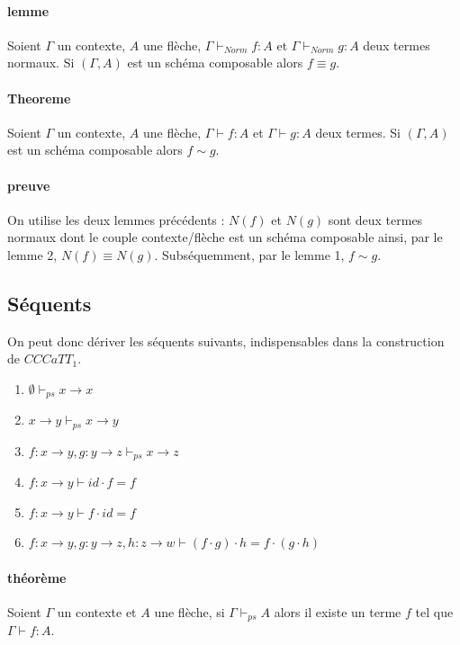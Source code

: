 \documentclass[12pt']{article}
\begin{document}
\paragraph{lemme} Soient $\Gamma$ un contexte, $A$ une flèche, $\Gamma \vdash_{Norm} f : A$ et $\Gamma \vdash_{Norm} g : A$ deux termes normaux. Si $(\Gamma, A)$ est un schéma composable alors $f \equiv g$.

\paragraph{Theoreme} Soient $\Gamma$ un contexte, $A$ une flèche, $\Gamma \vdash f : A$ et $\Gamma \vdash g : A$ deux termes. Si $(\Gamma, A)$ est un schéma composable alors $f \sim g$.

\paragraph{preuve} On utilise les deux lemmes précédents : $N(f)$ et $N(g)$ sont deux termes normaux dont le couple contexte/flèche est un schéma composable ainsi, par le lemme 2, $N(f) \equiv N(g)$. Subséquemment, par le lemme 1, $f \sim g$.

\subsection{Séquents}
On peut donc dériver les séquents suivants, indispensables dans la construction de $CCCaTT_1$.

\begin{enumerate}
	\item $\emptyset \vdash_{ps} x \rightarrow x$
	\item $x \rightarrow y \vdash_{ps} x \rightarrow y$
	\item $f : x \rightarrow y, g : y \rightarrow z \vdash_{ps} x \rightarrow z$
	\item $f : x \rightarrow y \vdash id \cdot f = f$
	\item $f : x \rightarrow y \vdash f \cdot id = f$
	\item $f : x \rightarrow y, g : y \rightarrow z, h : z \rightarrow w \vdash (f \cdot g) \cdot h = f \cdot (g \cdot h)$
\end{enumerate}

\paragraph{théorème}Soient $\Gamma$ un contexte et $A$ une flèche, si $\Gamma \vdash_{ps} A$ alors il existe un terme $f$ tel que $\Gamma \vdash f : A$.
\end{document}
